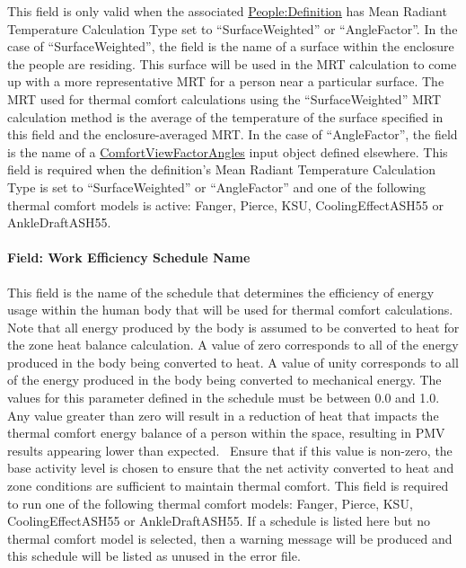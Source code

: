 This field is only valid when the associated \hyperref[peopledefinition]{People:Definition} has Mean Radiant Temperature Calculation Type set to ``SurfaceWeighted'' or ``AngleFactor''. In the case of ``SurfaceWeighted'', the field is the name of a surface within the enclosure the people are residing. This surface will be used in the MRT calculation to come up with a more representative MRT for a person near a particular surface. The MRT used for thermal comfort calculations using the ``SurfaceWeighted'' MRT calculation method is the average of the temperature of the surface specified in this field and the enclosure-averaged MRT. In the case of ``AngleFactor'', the field is the name of a \hyperref[comfortviewfactorangles]{ComfortViewFactorAngles} input object defined elsewhere. This field is required when the definition's Mean Radiant Temperature Calculation Type is set to ``SurfaceWeighted'' or ``AngleFactor'' and one of the following thermal comfort models is active: Fanger, Pierce, KSU, CoolingEffectASH55 or AnkleDraftASH55.

\paragraph{Field: Work Efficiency Schedule Name}\label{field-work-efficiency-schedule-name-people-instance}

This field is the name of the schedule that determines the efficiency of energy usage within the human body that will be used for thermal comfort calculations. Note that all energy produced by the body is assumed to be converted to heat for the zone heat balance calculation. A value of zero corresponds to all of the energy produced in the body being converted to heat. A value of unity corresponds to all of the energy produced in the body being converted to mechanical energy. The values for this parameter defined in the schedule must be between 0.0 and 1.0. Any value greater than zero will result in a reduction of heat that impacts the thermal comfort energy balance of a person within the space, resulting in PMV results appearing lower than expected.~ Ensure that if this value is non-zero, the base activity level is chosen to ensure that the net activity converted to heat and zone conditions are sufficient to maintain thermal comfort. This field is required to run one of the following thermal comfort models: Fanger, Pierce, KSU, CoolingEffectASH55 or AnkleDraftASH55. If a schedule is listed here but no thermal comfort model is selected, then a warning message will be produced and this schedule will be listed as unused in the error file.

